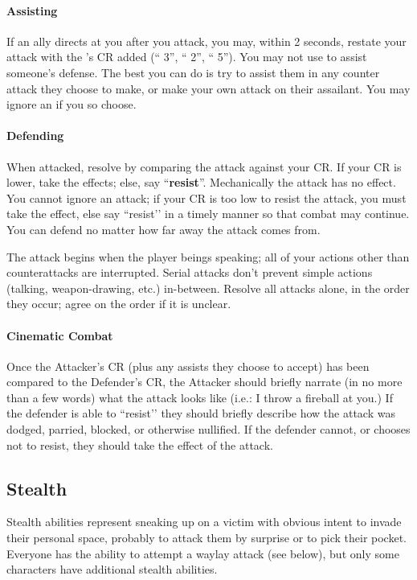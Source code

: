 \documentclass[sheet]{GL2020}
\begin{document}
\paragraph{Assisting} If an ally directs {\bf \aAssist{}} at you after you attack, you may, within 2 seconds, restate your attack with the \aAssist{}'s CR added (``\aKnockOut{} 3'', ``\aAssist{} 2'', ``\aKnockOut{} 5''). You may not use \aAssist{} to assist someone’s defense. The best you can do is try to assist them in any counter attack they choose to make, or make your own attack on their assailant. You may ignore an \aAssist{} if you so choose.

\paragraph{Defending} When attacked, resolve by comparing the attack against your CR.  If your CR is lower, take the effects; else, say ``{\bf resist}''. Mechanically the attack has no effect. You cannot ignore an attack; if your CR is too low to resist the attack, you must take the effect, else say ``resist’’ in a timely manner so that combat may continue. You can defend no matter how far away the attack comes from.

The attack begins when the player beings speaking; all of your actions other than counterattacks are interrupted. Serial attacks don't prevent simple actions (talking, weapon-drawing, etc.) in-between. Resolve all attacks alone, in the order they occur; agree on the order if it is unclear.

\paragraph{Cinematic Combat} Once the Attacker’s CR (plus any assists they choose to accept) has been compared to the Defender’s CR, the Attacker should briefly narrate (in no more than a few words) what the attack looks like (i.e.: I throw a fireball at you.) If the defender is able to ``resist’’ they should briefly describe how the attack was dodged, parried, blocked, or otherwise nullified. If the defender cannot, or chooses not to resist, they should take the effect of the attack.

\subsection{Stealth}

Stealth abilities represent sneaking up on a victim with obvious intent to invade their personal space, probably to attack them by surprise or to pick their pocket. Everyone has the ability to attempt a waylay attack (see below), but only some characters have additional stealth abilities.
\end{document}
